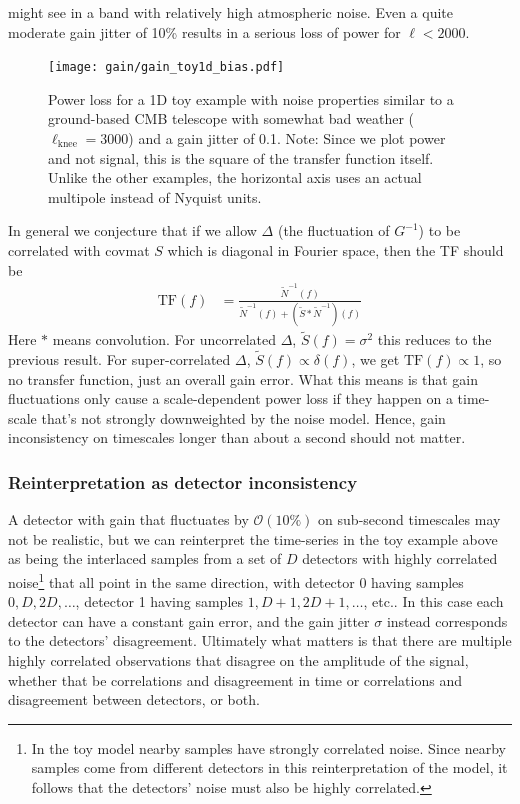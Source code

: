 \documentclass{aa}
\begin{document}
might see in a band with relatively high atmospheric noise. Even a quite moderate
gain jitter of 10\% results in a serious loss of power for $\ell < 2000$.
\begin{figure}[ht]
	\centering
	\texttt{[image: gain/gain\_toy1d\_bias.pdf]}
	\caption{Power loss for a 1D toy example with noise properties similar to
	a ground-based CMB telescope with somewhat bad weather ($\ell_\text{knee}=3000$)
	and a gain jitter of 0.1. Note: Since we plot power and not signal, this is the
	square of the transfer function itself. Unlike the other examples, the horizontal axis
	uses an actual multipole instead of Nyquist units.}
	\label{fig:gain-tf-1d}
\end{figure}

In general we conjecture that if we allow $\Delta$ (the fluctuation of $G^{-1}$)
to be correlated with covmat $S$ which is diagonal in Fourier space, then the TF should be
\begin{align}
\text{TF}(f) &= \frac{\widetilde{N}^{-1}(f)}{\widetilde{N}^{-1}(f) + (\widetilde{S} \ast \widetilde{N}^{-1})(f)}
\end{align}
Here $\ast$ means convolution. For uncorrelated $\Delta$, $\widetilde S(f) = \sigma^2$
this reduces to the previous result.
For super-correlated $\Delta$, $\widetilde S(f) \propto \delta(f)$, we get $\text{TF}(f) \propto 1$,
so no transfer function, just an overall gain error. What this means is that gain fluctuations
only cause a scale-dependent power loss if they happen on a time-scale that's not strongly
downweighted by the noise model. Hence, gain inconsistency on timescales longer than about a
second should not matter.

\subsubsection{Reinterpretation as detector inconsistency}
A detector with gain that fluctuates by $\mathcal{O}(10\%)$ on sub-second timescales may not be
realistic, but we can reinterpret the time-series in the toy example above as being the interlaced
samples from a set of $D$ detectors with highly correlated noise\footnote{
In the toy model nearby samples have strongly correlated noise. Since nearby samples come from
different detectors in this reinterpretation of the model, it follows that the detectors' noise
must also be highly correlated.
} that all point in the same direction, with detector 0 having
samples $0,D,2D,\ldots$, detector 1 having samples $1,D+1,2D+1,\ldots$, etc.. In this case each detector
can have a constant gain error, and the gain jitter $\sigma$ instead corresponds to the detectors'
disagreement. Ultimately what matters is that there are multiple highly correlated observations
that disagree on the amplitude of the signal, whether that be correlations and disagreement in
time or correlations and disagreement between detectors, or both.
\end{document}
